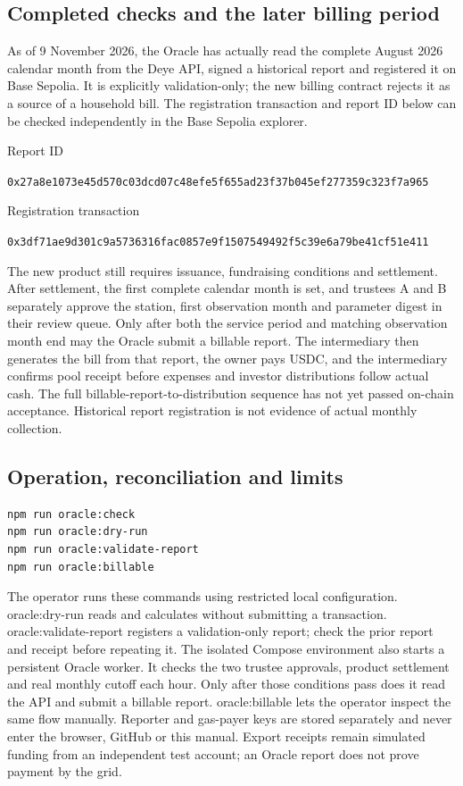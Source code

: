 \documentclass[12pt,a4paper]{article}
\begin{document}
\subsection{Completed checks and the later billing period}
As of 9 November 2026, the Oracle has actually read the complete August 2026 calendar month from the Deye API, signed a historical report and registered it on Base Sepolia. It is explicitly validation-only; the new billing contract rejects it as a source of a household bill. The registration transaction and report ID below can be checked independently in the Base Sepolia explorer.

Report ID\par\nolinkurl{0x27a8e1073e45d570c03dcd07c48efe5f655ad23f37b045ef277359c323f7a965}\par
Registration transaction\par\nolinkurl{0x3df71ae9d301c9a5736316fac0857e9f1507549492f5c39e6a79be41cf51e411}\par
The new product still requires issuance, fundraising conditions and settlement. After settlement, the first complete calendar month is set, and trustees A and B separately approve the station, first observation month and parameter digest in their review queue. Only after both the service period and matching observation month end may the Oracle submit a billable report. The intermediary then generates the bill from that report, the owner pays USDC, and the intermediary confirms pool receipt before expenses and investor distributions follow actual cash. The full billable-report-to-distribution sequence has not yet passed on-chain acceptance. Historical report registration is not evidence of actual monthly collection.

\subsection{Operation, reconciliation and limits}
\begin{verbatim}
npm run oracle:check
npm run oracle:dry-run
npm run oracle:validate-report
npm run oracle:billable
\end{verbatim}
The operator runs these commands using restricted local configuration. oracle:dry-run reads and calculates without submitting a transaction. oracle:validate-report registers a validation-only report; check the prior report and receipt before repeating it. The isolated Compose environment also starts a persistent Oracle worker. It checks the two trustee approvals, product settlement and real monthly cutoff each hour. Only after those conditions pass does it read the API and submit a billable report. oracle:billable lets the operator inspect the same flow manually. Reporter and gas-payer keys are stored separately and never enter the browser, GitHub or this manual. Export receipts remain simulated funding from an independent test account; an Oracle report does not prove payment by the grid.
\end{document}
